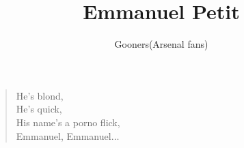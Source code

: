 \documentclass[a4paper,12pt]{article}
\title{Emmanuel Petit}
\author{Gooners(Arsenal fans)}
\date{}
\begin{document}
	
	\maketitle
	
	\begin{verse}
		
		He's blond, \\
		He's quick, \\
		His name's a porno flick, \\
		Emmanuel, Emmanuel$\ldots$
		
	\end{verse}
	
\end{document}
